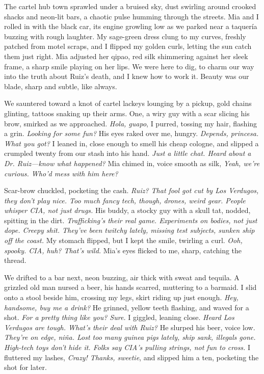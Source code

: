 \documentclass[12pt,oneside]{book}
\begin{document}
The cartel hub town sprawled under a bruised sky, dust swirling around crooked shacks and neon-lit bars, a chaotic pulse humming through the streets. Mia and I rolled in with the black car, its engine growling low as we parked near a taquería buzzing with rough laughter. My sage-green dress clung to my curves, freshly patched from motel scraps, and I flipped my golden curls, letting the sun catch them just right. Mia adjusted her qipao, red silk shimmering against her sleek frame, a sharp smile playing on her lips. We were here to dig, to charm our way into the truth about Ruiz’s death, and I knew how to work it. Beauty was our blade, sharp and subtle, like always.

We sauntered toward a knot of cartel lackeys lounging by a pickup, gold chains glinting, tattoos snaking up their arms. One, a wiry guy with a scar slicing his brow, smirked as we approached. \textit{Hola, guapo}, I purred, tossing my hair, flashing a grin. \textit{Looking for some fun?} His eyes raked over me, hungry. \textit{Depends, princesa. What you got?} I leaned in, close enough to smell his cheap cologne, and slipped a crumpled twenty from our stash into his hand. \textit{Just a little chat. Heard about a Dr. Ruiz—know what happened?} Mia chimed in, voice smooth as silk, \textit{Yeah, we’re curious. Who’d mess with him here?}

Scar-brow chuckled, pocketing the cash. \textit{Ruiz? That fool got cut by Los Verdugos, they don’t play nice. Too much fancy tech, though, drones, weird gear. People whisper CIA, not just drugs.} His buddy, a stocky guy with a skull tat, nodded, spitting in the dirt. \textit{Trafficking’s their real game. Experiments on bodies, not just dope. Creepy shit. They’ve been twitchy lately, missing test subjects, sunken ship off the coast.} My stomach flipped, but I kept the smile, twirling a curl. \textit{Ooh, spooky. CIA, huh? That’s wild.} Mia’s eyes flicked to me, sharp, catching the thread.

We drifted to a bar next, neon buzzing, air thick with sweat and tequila. A grizzled old man nursed a beer, his hands scarred, muttering to a barmaid. I slid onto a stool beside him, crossing my legs, skirt riding up just enough. \textit{Hey, handsome, buy me a drink?} He grinned, yellow teeth flashing, and waved for a shot. \textit{For a pretty thing like you? Sure.} I giggled, leaning close. \textit{Heard Los Verdugos are tough. What’s their deal with Ruiz?} He slurped his beer, voice low. \textit{They’re on edge, niña. Lost too many guinea pigs lately, ship sank, illegals gone. High-tech toys don’t hide it. Folks say CIA’s pulling strings, not fun to cross.} I fluttered my lashes, \textit{Crazy! Thanks, sweetie}, and slipped him a ten, pocketing the shot for later.
\end{document}
